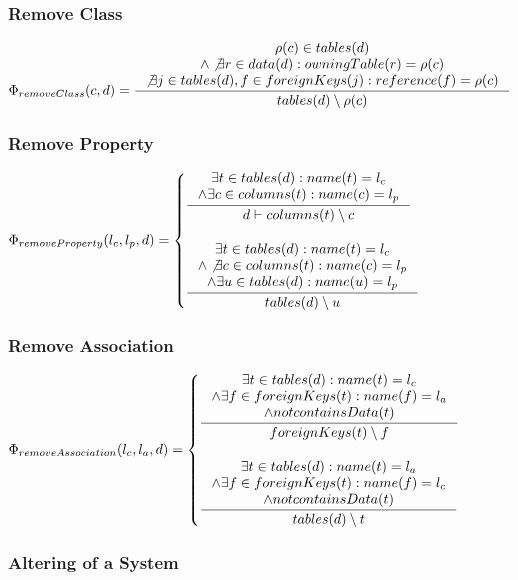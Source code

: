 \documentclass[11pt]{article}
\begin{document}
\subsubsection{Remove Class}
$
\Phi_{removeClass}(c,d) = \inference{ \rho(c) \in tables(d) \\ \wedge \not \exists r \in data(d) : owningTable(r) = \rho(c) \\ \not \exists j \in tables(d), f \in foreignKeys(j) : reference(f) = \rho(c)  }{ tables(d) \setminus \rho(c)}
$

\subsubsection{Remove Property}
$
\Phi_{removeProperty}(l_c, l_p, d) = \begin{cases}
 \inference{ \exists t \in tables(d) : name(t) = l_c \\ \wedge \exists c \in columns(t) : name(c) = l_p  }{d \vdash
columns(t) \setminus c
} \\ \\
  \inference{ \exists t \in tables(d) : name(t) = l_c \\ \wedge \not \exists c \in columns(t) : name(c) = l_p \\ \wedge \exists u \in tables(d) : name(u) = l_p }{ tables(d) \setminus u }
 \end{cases}
$

\subsubsection{Remove Association}
$
\Phi_{removeAssociation}(l_c, l_a, d) =  \begin{cases}
 \inference{\exists t \in tables(d) : name(t) = l_c 
 \\ \wedge \exists f \in foreignKeys(t) : name(f) = l_a 
 \\ \wedge not containsData(t)}{ foreignKeys(t) \setminus f }
 \\ \\
 \inference{\exists t \in tables(d) : name(t) = l_a 
 \\ \wedge \exists f \in foreignKeys(t) : name(f) = l_c
 \\ \wedge not containsData(t)}{ tables(d) \setminus t}
 \end{cases}
$

\subsubsection{Altering of a System}	
\end{document}
